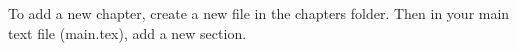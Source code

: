 
To add a new chapter, create a new file in the chapters folder. Then in your main text file (main.tex), add a new section. 


% 

